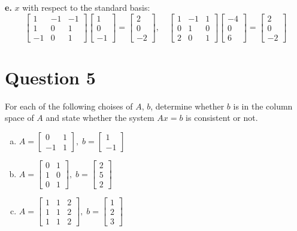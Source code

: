 \documentclass{article}
\begin{document}
\textbf{e.} $x$ with respect to the standard basis:
$$
\begin{bmatrix} 1 & -1 & -1 \\ 1 & 0 & 1 \\ -1 & 0 & 1 \end{bmatrix} \begin{bmatrix} 1 \\ 0 \\ -1 \end{bmatrix}
= \begin{bmatrix} 2 \\ 0 \\ -2 \end{bmatrix}
, \quad
\begin{bmatrix} 1 & -1 & 1 \\ 0 & 1 & 0 \\ 2 & 0 & 1 \end{bmatrix} \begin{bmatrix} -4 \\ 0 \\ 6 \end{bmatrix}
= \begin{bmatrix} 2 \\ 0 \\ -2 \end{bmatrix}
$$

\newpage
\section*{Question 5}
For each of the following choises of $A$, $b$, determine whether $b$ is in the column space of $A$ and state whether the system $Ax = b$ is consistent or not.
\begin{enumerate}[a.]
    \item $A = \begin{bmatrix} 0 & 1 \\ -1 & 1 \end{bmatrix}, \; b = \begin{bmatrix} 1 \\ -1 \end{bmatrix}$
    \item $A = \begin{bmatrix} 0 & 1 \\ 1 & 0 \\ 0 & 1 \end{bmatrix}, \; b = \begin{bmatrix} 2 \\ 5 \\ 2 \end{bmatrix}$
    \item $A = \begin{bmatrix} 1 & 1 & 2 \\ 1 & 1 & 2 \\ 1 & 1 & 2 \end{bmatrix}, \; b = \begin{bmatrix} 1 \\ 2 \\ 3 \end{bmatrix}$
\end{enumerate}
\end{document}
